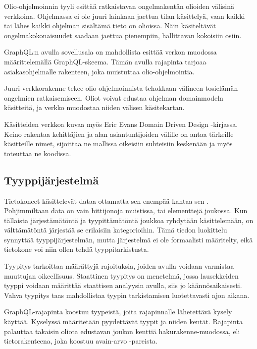 Olio-ohjelmoinnin tyyli esittää ratkaistavan ongelmakentän olioiden
välisinä verkkoina. Ohjelmassa ei ole juuri lainkaan jaettua tilan
käsittelyä, vaan kaikki tai lähes kaikki ohjelman sisältämä tieto on
olioissa. Näin käsiteltävät ongelmakokonaisuudet saadaan jaettua
pienempiin, hallittavan kokoisiin osiin. \cite{booch2008object}

GraphQL:n avulla sovellusala on mahdollista esittää verkon muodossa
määrittelemällä GraphQL-skeema. Tämän avulla rajapinta tarjoaa
asiakasohjelmalle rakenteen, joka muistuttaa
olio-ohjelmointia.\cite{thinkingInGraphs}

Juuri verkkorakenne tekee olio-ohjelmoinnista tehokkaan välineen
tosielämän ongelmien ratkaisemiseen. Oliot voivat edustaa ohjelman
\gls{domainmodel}n käsitteitä, ja verkko muodostaa niiden välisen
käsitekartan.

Käsitteiden verkkoa kuvaa myös Eric Evans Domain Driven Design
-kirjassa. Keino rakentaa  kehittäjien ja alan
asiantuntijoiden välille on antaa tärkeille käsitteille nimet, sijoittaa
ne mallissa oikeisiin suhteisiin keskenään ja myös toteuttaa ne
koodissa.

\hypertarget{tyyppijuxe4rjestelmuxe4}{%
\subsection{Tyyppijärjestelmä}\label{tyyppijuxe4rjestelmuxe4}}

Tietokoneet käsittelevät dataa ottamatta sen enempää kantaa sen
. Pohjimmiltaan data on vain bittijonoja
muistissa, tai elementtejä joukossa. Kun tällaista järjestämätöntä ja
tyypittämätöntä joukkoa ryhdytään käsittelemään, on välttämätöntä
järjestää se erilaisiin kategorioihin. Tämä tiedon luokittelu synnyttää
tyyppijärjestelmän, mutta järjestelmä ei ole formaalisti määritelty,
eikä tietokone voi niin ollen tehdä tyyppitarkistusta.

Tyypitys tarkoittaa määrättyjä rajoituksia, joiden avulla voidaan
varmistaa muuttujan oikeellisuus. Staattinen tyypitys on menetelmä,
jossa lausekkeiden tyyppi voidaan määrittää staattisen analyysin avulla,
siis jo käännösaikaisesti. Vahva tyypitys taas mahdollistaa tyypin
tarkistamisen luotettavasti ajon aikana. \cite{Cardelli+Wegner:1985}

GraphQL-rajapinta koostuu tyypeistä, joita rajapinnalle lähetettävä
kysely käyttää. Kyselyssä määritetään pyydettävät tyypit ja niiden
kentät. Rajapinta palauttaa takaisin oliota edustavan joukon kenttiä
\gls{hakurakenne}-muodossa, eli tietorakenteena, joka koostuu avain-arvo
-pareista. \cite{graphql:spec}

